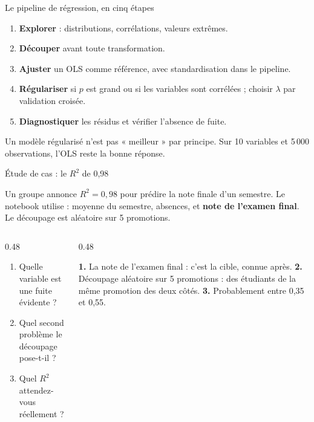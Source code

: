 \begin{frame}{Le pipeline de régression, en cinq étapes}
\begin{enumerate}
  \item \textbf{Explorer} : distributions, corrélations, valeurs extrêmes.
  \item \textbf{Découper} avant toute transformation.
  \item \textbf{Ajuster} un OLS comme référence, avec standardisation dans le
        pipeline.
  \item \textbf{Régulariser} si $p$ est grand ou si les variables sont
        corrélées ; choisir $\lambda$ par validation croisée.
  \item \textbf{Diagnostiquer} les résidus et vérifier l'absence de fuite.
\end{enumerate}
\vspace{1.5mm}
\begin{kbox}[Le réflexe]
Un modèle régularisé n'est pas « meilleur » par principe. Sur 10 variables et
5\,000 observations, l'OLS reste la bonne réponse.
\end{kbox}
\end{frame}

\begin{frame}{Étude de cas : le $R^2$ de 0,98}
\begin{abox}[La situation]
Un groupe annonce $R^2=0{,}98$ pour prédire la note finale d'un semestre.
Le notebook utilise : moyenne du semestre, absences, et \textbf{note de
l'examen final}. Le découpage est aléatoire sur 5 promotions.
\end{abox}
\vspace{1mm}
\begin{columns}[t]
\begin{column}{0.48\textwidth}
\begin{enumerate}
  \item Quelle variable est une fuite évidente ?
  \item Quel second problème le découpage pose-t-il ?
  \item Quel $R^2$ attendez-vous réellement ?
\end{enumerate}
\end{column}
\begin{column}{0.48\textwidth}
\begin{solbox}[Réponses]
\textbf{1.} La note de l'examen final : c'est la cible, connue après.
\textbf{2.} Découpage aléatoire sur 5 promotions : des étudiants de la même
promotion des deux côtés. \textbf{3.} Probablement entre 0,35 et 0,55.
\end{solbox}
\end{column}
\end{columns}
\end{frame}

